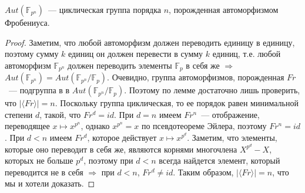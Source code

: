 \begin{theorem-non}
    $Aut(\mathbb{F}_{p^n})$~--- циклическая группа порядка $n$, порожденная автоморфизмом Фробениуса.
\end{theorem-non}
\begin{proof}
    Заметим, что любой автоморфизм должен переводить единицу в единицу, поэтому сумму $k$ единиц он должен перевести в сумму $k$ единиц, т.е. любой автоморфизм $\mathbb{F}_{p^n}$ должен переводить элементы $\mathbb{F}_p$ в себя же $\Rightarrow$ $Aut(\mathbb{F}_{p^n}) = Aut(\mathbb{F}_{p^n} / \mathbb{F}_p)$.
    Очевидно, группа автоморфизмов, порожденная $Fr$~--- подгруппа в в $Aut(\mathbb{F}_{p^n} / \mathbb{F}_p)$.
    Поэтому по лемме достаточно лишь проверить, что $|\langle Fr\rangle| = n$.
    Поскольку группа циклическая, то ее порядок равен минимальной степени $d$, такой, что $Fr^d=id$.
    При $d=n$ имеем $Fr^n$~--- отображение, переводящее $x \mapsto x^{p^n}$, однако $x^{p^n}=x$ по псевдотеореме Эйлера, поэтому $Fr^n = id$.
    При $d<n$ имеем $Fr^d$, которое действует $x \mapsto x^{p^d}$. 
    Заметим, что элементы, которые оно переводит в себя же, являются корнями многочлена $X^{p^d}-X$, которых не больше $p^d$, поэтому при $d<n$ всегда найдется элемент, который переводится не в себя $\Rightarrow$ при $d<n$, $Fr^d \neq id$.
    Таким образом, $|\langle Fr\rangle | = n$, что мы и хотели доказать.
\end{proof}